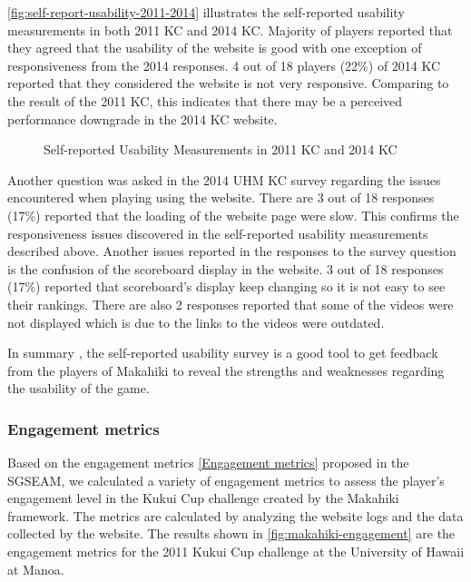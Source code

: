 \autoref{fig:self-report-usability-2011-2014} illustrates the self-reported usability measurements in both 2011 KC and 2014 KC. Majority of players reported that they agreed that the usability of the website is good with one exception of responsiveness from the 2014 responses. 4 out of 18 players (22\%) of 2014 KC reported that they considered the website is not very responsive. Comparing to the result of the 2011 KC, this indicates that there may be a perceived performance downgrade in the 2014 KC website.

\begin{figure}[ht!]
	\centering
		\caption{Self-reported Usability Measurements in 2011 KC and 2014 KC}
		\label{fig:self-report-usability-2011-2014}
\end{figure}

Another question was asked in the 2014 UHM KC survey regarding the issues encountered when playing using the website. There are 3 out of 18 responses (17\%) reported that the loading of the website page were slow. This confirms the responsiveness issues discovered in the self-reported usability measurements described above. Another issues reported in the responses to the survey question is the confusion of the scoreboard display in the website. 3 out of 18 responses (17\%) reported that scoreboard's display keep changing so it is not easy to see their rankings. There are also 2 responses reported that some of the videos were not displayed which is due to the links to the videos were outdated.

In summary , the self-reported usability survey is a good tool to get feedback from the players of Makahiki to reveal the strengths and weaknesses regarding the usability of the game. 

\subsubsection{Engagement metrics}

Based on the engagement metrics \ref{Engagement metrics} proposed in the SGSEAM, we calculated a variety of engagement metrics to assess the player's engagement level in the Kukui Cup challenge created by the Makahiki framework. The metrics are calculated by analyzing the website logs and the data collected by the website. The results shown in \autoref{fig:makahiki-engagement} are the engagement metrics for the 2011 Kukui Cup challenge at the University of Hawaii at Manoa.
    
